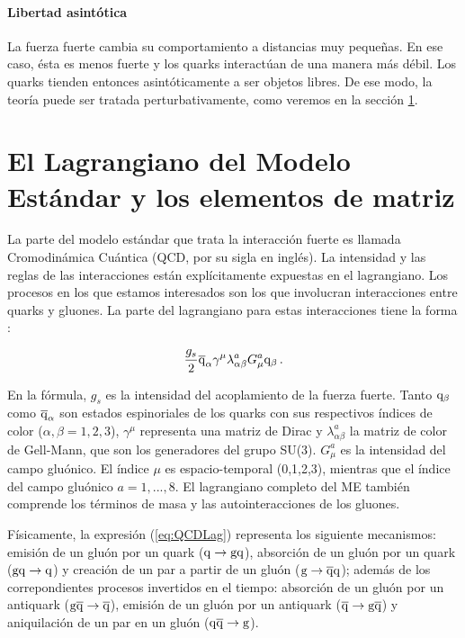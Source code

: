 \paragraph{Libertad asintótica} La fuerza fuerte cambia su comportamiento a distancias muy pequeñas. En ese caso, ésta es menos fuerte y los quarks interactúan de una manera más débil. Los quarks tienden entonces asintóticamente a ser objetos libres. De ese modo, la teoría puede ser tratada perturbativamente, como veremos en la sección \ref{subsec:QCDLag}.

\section{El Lagrangiano del Modelo Estándar y los elementos de matriz}
\label{subsec:QCDLag}

La parte del modelo estándar que trata la interacción fuerte es llamada Cromodinámica Cuántica (QCD, por su sigla en inglés). La intensidad y las reglas de las interacciones están explícitamente expuestas en el lagrangiano. Los procesos en los que estamos interesados son los que involucran interacciones entre quarks y gluones. La parte del lagrangiano para estas interacciones tiene la forma \cite{Kane:1993}:

 \begin{equation}
  \frac{g_s}2 \overline{\mathrm q}_\alpha \gamma^\mu \lambda^a_{\alpha \beta} G_\mu^a {\mathrm q}_\beta\label{eq:QCDLag}
  \, .
\end{equation}

En la fórmula, $g_s$ es la intensidad del acoplamiento de la fuerza fuerte. Tanto ${\mathrm q}_\beta$ como $\overline{\mathrm q}_\alpha$ son estados espinoriales de los quarks con sus respectivos índices de color ($\alpha,\beta = 1,2,3$), $\gamma^\mu$ representa una matriz de Dirac y $\lambda^a_{\alpha\beta}$ la matriz de color de Gell-Mann, que son los generadores del grupo SU(3). $G_\mu^a$ es la intensidad del campo gluónico. El índice $\mu$ es espacio-temporal (0,1,2,3), mientras que el índice del campo gluónico $a=1,...,8$. El lagrangiano completo del ME también comprende los términos de masa y las autointeracciones de los gluones.

Físicamente, la expresión (\ref{eq:QCDLag}) representa los siguiente mecanismos: emisión de un gluón por un quark (${\mathrm q}\to{\mathrm g}{\mathrm q}$), absorción de un gluón por un quark (${\mathrm g}{\mathrm q}\to{\mathrm q}$) y creación de un par a partir de un gluón (${\mathrm g}\to\overline{\mathrm q}{\mathrm q}$); además de los correpondientes procesos invertidos en el tiempo: absorción de un gluón por un antiquark (${\mathrm g}\overline{\mathrm q}\to\overline{\mathrm q}$), emisión de un gluón por un antiquark ($\overline{\mathrm q}\to{\mathrm g}\overline{\mathrm q}$) y aniquilación de un par en un gluón (${\mathrm q}\overline{\mathrm q}\to{\mathrm g}$).


